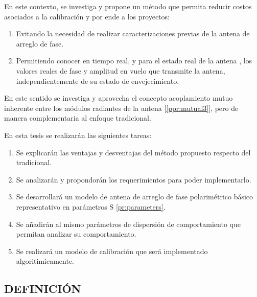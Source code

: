 \documentclass[a4paper,10pt]{article}
\begin{document}
En este contexto, se investiga y propone un método que permita reducir costos 
asociados a la calibración y por ende a los proyectos:

\begin{enumerate}
    \item Evitando la necesidad de realizar caracterizaciones previas de la 
antena de arreglo de fase.
    \item Permitiendo conocer en tiempo real, y para el estado real de la antena
, los valores reales de fase y amplitud en vuelo que transmite la antena, 
independientemente de su estado de envejecimiento.
\end{enumerate}

En este sentido se investiga y aprovecha el concepto acoplamiento mutuo 
inherente entre los módulos radiantes de la antena [\ref{ppr:mutual3}], pero de
manera complementaria al enfoque tradicional. 

En esta tesis se realizarán las siguientes tareas:

\begin{enumerate}
    \item Se explicarán las ventajas y desventajas del método propuesto respecto
del tradicional.
    \item Se analizarán y propondorán los requerimientos para poder 
implementarlo.
    \item Se desarrollará un modelo de antena de arreglo de fase polarimétrico 
básico representativo en parámetros S \ref{pr:parameters}.
    \item Se añadirán al mismo parámetros de dispersión de comportamiento que 
permitan analizar su comportamiento.
    \item Se realizará un modelo de calibración que será implementado 
algoritimicamente.
\end{enumerate}

\subsection{DEFINICIÓN}
\end{document}
